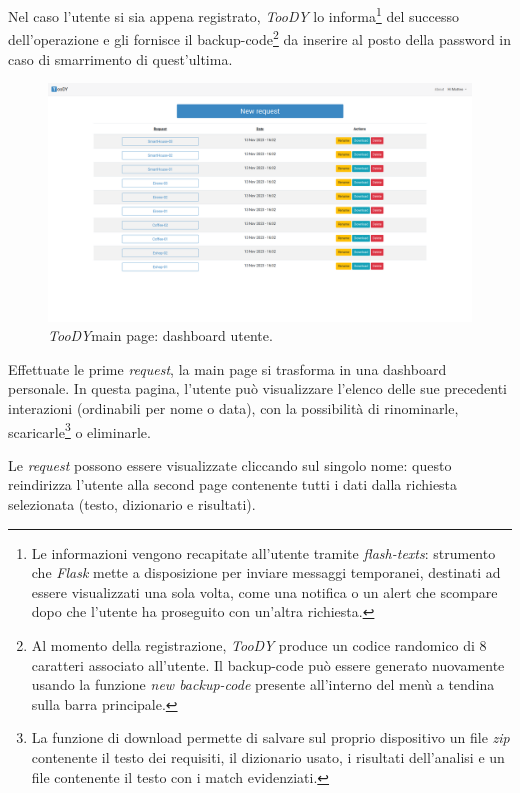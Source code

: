 \documentclass[12pt]{report}
\newcommand{\toody}{\textsl{TooDY}\xspace}
\newcommand{\flask}{\textsl{Flask}\xspace}
\begin{document}
Nel caso l'utente si sia appena registrato, \toody lo informa\footnote{Le informazioni vengono recapitate all'utente tramite \textit{flash-texts}: strumento che \flask mette a disposizione per inviare messaggi temporanei, destinati ad essere visualizzati una sola volta, come una notifica o un alert che scompare dopo che l'utente ha proseguito con un'altra richiesta.} del successo dell'operazione e gli fornisce il backup-code\footnote{Al momento della registrazione, \toody produce un codice randomico di 8 caratteri associato all'utente. Il backup-code può essere generato nuovamente usando la funzione \textit{new backup-code} presente all'interno del menù a tendina sulla barra principale.} da inserire al posto della password in caso di smarrimento di quest'ultima.

\begin{figure}[H]
\centering
\includegraphics[width=1.0\textwidth]{pagina1-lista.png}
\caption{\toody \textsf{main page}: dashboard utente.}
\label{fig:pagina1-login}
\end{figure}

Effettuate le prime \textit{request}, la \textsf{main page} si trasforma in una dashboard personale. In questa pagina, l'utente può visualizzare l'elenco delle sue precedenti interazioni (ordinabili per nome o data), con la possibilità di rinominarle, scaricarle\footnote{La funzione di download permette di salvare sul proprio dispositivo un file \textit{zip} contenente il testo dei requisiti, il dizionario usato, i risultati dell'analisi e un file contenente il testo con i match evidenziati.} o eliminarle.

Le \textit{request} possono essere visualizzate cliccando sul singolo nome: questo reindirizza l'utente alla \textsf{second page} contenente tutti i dati dalla richiesta selezionata (testo, dizionario e risultati).
\end{document}
